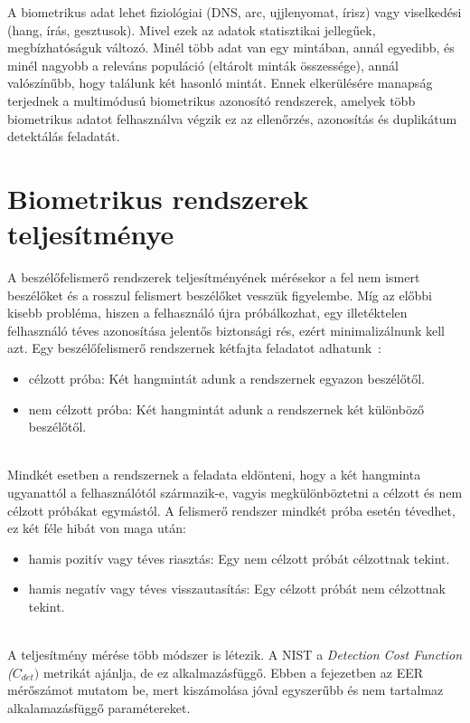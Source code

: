 A biometrikus adat lehet fiziológiai (DNS, arc, ujjlenyomat, írisz) vagy viselkedési (hang, írás, gesztusok). Mivel ezek az adatok statisztikai jellegűek, megbízhatóságuk változó. Minél több adat van egy mintában, annál egyedibb, és minél nagyobb a releváns populáció (eltárolt minták összessége), annál valószínűbb, hogy találunk két hasonló mintát. Ennek elkerülésére manapság terjednek a multimódusú biometrikus azonosító rendszerek, amelyek több biometrikus adatot felhasználva végzik ez az ellenőrzés, azonosítás és duplikátum detektálás feladatát. 

\section{Biometrikus rendszerek teljesítménye}

A beszélőfelismerő rendszerek teljesítményének mérésekor a fel nem ismert beszélőket és a rosszul felismert beszélőket vesszük figyelembe. Míg az előbbi kisebb probléma, hiszen a felhasználó újra próbálkozhat, egy illetéktelen felhasználó téves azonosítása jelentős biztonsági rés, ezért minimalizálnunk kell azt.
\newline
\newline
Egy beszélőfelismerő rendszernek kétfajta feladatot adhatunk~\cite{van_leeuwen_2007}:
\begin{itemize}
	\item célzott próba: Két hangmintát adunk a rendszernek egyazon beszélőtől.
	\item nem célzott próba: Két hangmintát adunk a rendszernek két különböző beszélőtől.
\end{itemize} 
\ \\
Mindkét esetben a rendszernek a feladata eldönteni, hogy a két hangminta ugyanattól a felhasználótól származik-e, vagyis megkülönböztetni a célzott és nem célzott próbákat egymástól.
A felismerő rendszer mindkét próba esetén tévedhet, ez két féle hibát von maga után:

\begin{itemize}
	\item hamis pozitív vagy téves riasztás: Egy nem célzott próbát célzottnak tekint.
	\item hamis negatív vagy téves visszautasítás: Egy célzott próbát nem célzottnak tekint.
\end{itemize} 
\ \\
A teljesítmény mérése több módszer is létezik. A NIST a \emph{Detection Cost Function ($C_{det})$} metrikát ajánlja, de ez alkalmazásfüggő. Ebben a fejezetben az EER mérőszámot mutatom be, mert kiszámolása jóval egyszerűbb és nem tartalmaz alkalamazásfüggő paramétereket.

